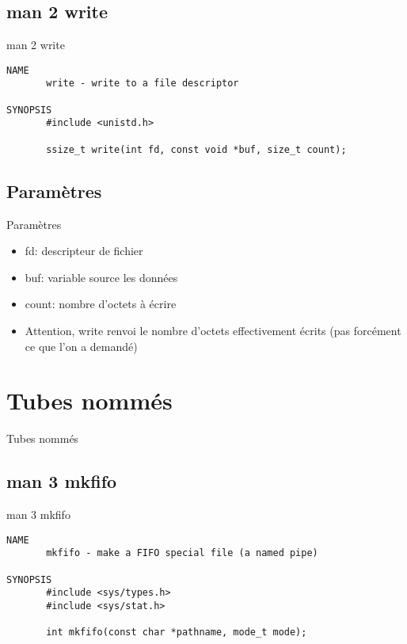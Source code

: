 \begin{frame}[containsverbatim]{\sectitle}
\def\subsectitle{man 2 write}
\subsection{\subsectitle}
\begin{block}{\subsectitle}
\begin{verbatim}
NAME
       write - write to a file descriptor

SYNOPSIS
       #include <unistd.h>

       ssize_t write(int fd, const void *buf, size_t count);
\end{verbatim}
\end{block}
\end{frame}

\begin{frame}[containsverbatim]{\sectitle}
\def\subsectitle{Paramètres}
\subsection{\subsectitle}
\begin{block}{\subsectitle}
\begin{itemize}
    \item fd: descripteur de fichier
    \item buf: variable source les données
    \item count: nombre d'octets à écrire
    \item Attention, write renvoi le nombre d'octets effectivement écrits (pas
    forcément ce que l'on a demandé)
\end{itemize}
\end{block}
\end{frame}

\def\sectitle{Tubes nommés}
\section{\sectitle}
\begin{frame}[containsverbatim]{\sectitle}
\def\subsectitle{man 3 mkfifo}
\subsection{\subsectitle}
\begin{block}{\subsectitle}
\begin{verbatim}
NAME
       mkfifo - make a FIFO special file (a named pipe)

SYNOPSIS
       #include <sys/types.h>
       #include <sys/stat.h>

       int mkfifo(const char *pathname, mode_t mode);
\end{verbatim}
\end{block}
\end{frame}

